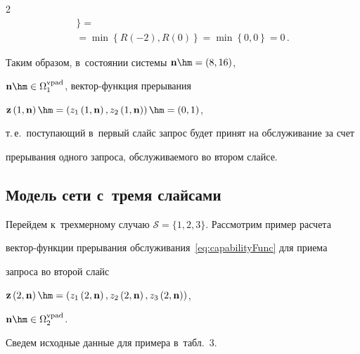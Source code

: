 \begin{multicols}{2}
\begin{multline*}
\biggl\} = {}\\


{}= \min \left\{R \left(-2\right),R \left(0\right) \right\} = \min 


\left\{0,0\right\} = 0\,.


\end{multline*}





\vspace*{-4pt}





Таким образом, в~состоянии системы $\mathbf{n}\hm=\left(8,16\right)$, 


$\mathbf{n}\hm\in\Omega_1^{\mathrm{vpad}}$, век\-тор-функ\-ция прерывания 


$\mathbf{z}\left(1,\mathbf{n}\right)\hm=\left(z_1\left(1,\mathbf{n}\right),z_2\left


(1,\mathbf{n}\right)\right)\hm=\left(0,1\right)$,


т.\,е.\ поступающий в~первый слайс запрос будет принят на обслуживание за счет 


прерывания одного запроса, об\-слу\-жи\-ва\-емо\-го во втором слайсе.








\subsection{Модель сети с~тремя слайсами}





Перейдем к~трехмерному случаю $\mathcal{S}=\{1,2,3\}$. Рассмотрим пример расчета 


век\-тор-функ\-ции прерывания обслуживания~\eqref{eq:capabilityFunc} для приема 


запроса во второй слайс 


$\mathbf{z}\left(2,\mathbf{n}\right)\hm=\left(z_1\left(2,\mathbf{n}\right), 


z_2\left(2,\mathbf{n}\right), z_3\left(2,\mathbf{n}\right)\right)$, 


$\mathbf{n}\hm\in\Omega_2^{\mathrm{vpad}}$.





Сведем исходные данные для примера в~табл.~3.






\end{multicols}

